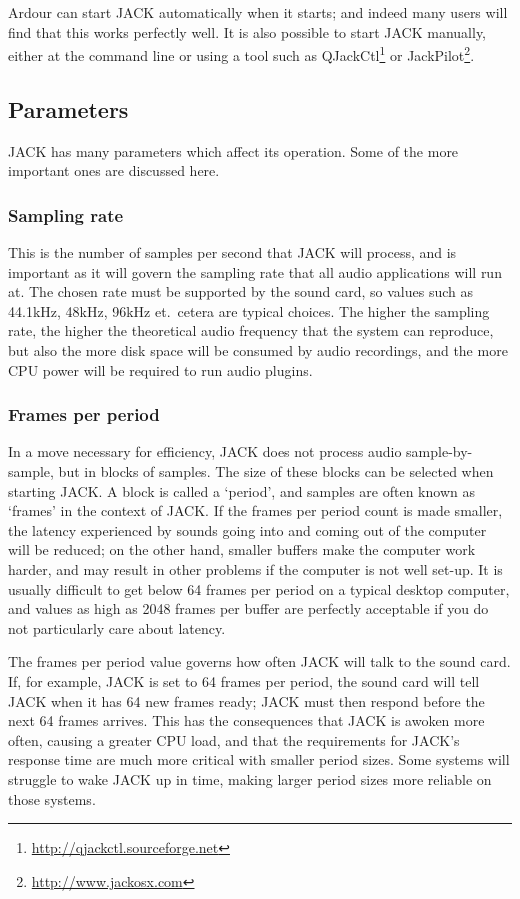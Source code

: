 \documentclass[10pt,a4paper]{book}
\begin{document}
Ardour can start JACK automatically when it starts; and indeed many
users will find that this works perfectly well.  It is also possible
to start JACK manually, either at the command line or using a tool
such as QJackCtl\footnote{\url{http://qjackctl.sourceforge.net}} or
JackPilot\footnote{\url{http://www.jackosx.com}}.

\subsection{Parameters}

JACK has many parameters which affect its operation.  Some of the more
important ones are discussed here.

\subsubsection{Sampling rate}

This is the number of samples per second that JACK will process, and
is important as it will govern the sampling rate that all audio
applications will run at.  The chosen rate must be supported
by the sound card, so values such as 44.1kHz, 48kHz, 96kHz
et.\ cetera are typical choices.  The higher the sampling rate, the
higher the theoretical audio frequency that the system can reproduce,
but also the more disk space will be consumed by audio recordings, and
the more CPU power will be required to run audio plugins.

\subsubsection{Frames per period}

In a move necessary for efficiency, JACK does not process audio
sample-by-sample, but in blocks of samples.  The size of these blocks
can be selected when starting JACK\@.  A block is called a `period',
and samples are often known as `frames' in the context of JACK\@.  If
the frames per period count is made smaller, the latency experienced
by sounds going into and coming out of the computer will be reduced;
on the other hand, smaller buffers make the computer work harder, and
may result in other problems if the computer is not well set-up.  It
is usually difficult to get below 64 frames per period on a typical
desktop computer, and values as high as 2048 frames per buffer are
perfectly acceptable if you do not particularly care about latency.

\begin{danger}
The frames per period value governs how often JACK will talk to the
sound card.  If, for example, JACK is set to 64 frames per period, the
sound card will tell JACK when it has 64 new frames ready; JACK must
then respond before the next 64 frames arrives.  This has the
consequences that JACK is awoken more often, causing a greater CPU
load, and that the requirements for JACK's response time are much more
critical with smaller period sizes.  Some systems will struggle to wake
JACK up in time, making larger period sizes more reliable on those systems.
\end{danger}
\end{document}
